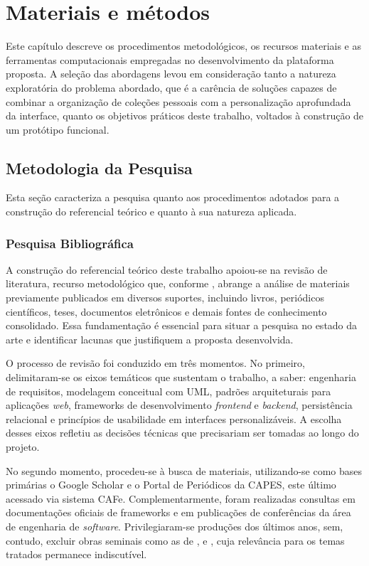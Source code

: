 \chapter{Materiais e métodos}
\label{cap:03}

Este capítulo descreve os procedimentos metodológicos, os recursos materiais e as ferramentas computacionais empregadas no desenvolvimento da plataforma proposta. A seleção das abordagens levou em consideração tanto a natureza exploratória do problema abordado, que é a carência de soluções capazes de combinar a organização de coleções pessoais com a personalização aprofundada da interface, quanto os objetivos práticos deste trabalho, voltados à construção de um protótipo funcional.

\section{Metodologia da Pesquisa}

Esta seção caracteriza a pesquisa quanto aos procedimentos adotados para a construção do referencial teórico e quanto à sua natureza aplicada.

\subsection{Pesquisa Bibliográfica}

A construção do referencial teórico deste trabalho apoiou-se na revisão de literatura, recurso metodológico que, conforme \cite{fontelles2009}, abrange a análise de materiais previamente publicados em diversos suportes, incluindo livros, periódicos científicos, teses, documentos eletrônicos e demais fontes de conhecimento consolidado. Essa fundamentação é essencial para situar a pesquisa no estado da arte e identificar lacunas que justifiquem a proposta desenvolvida.

O processo de revisão foi conduzido em três momentos. No primeiro, delimitaram-se os eixos temáticos que sustentam o trabalho, a saber: engenharia de requisitos, modelagem conceitual com UML, padrões arquiteturais para aplicações \textit{web}, frameworks de desenvolvimento \textit{frontend} e \textit{backend}, persistência relacional e princípios de usabilidade em interfaces personalizáveis. A escolha desses eixos refletiu as decisões técnicas que precisariam ser tomadas ao longo do projeto.

No segundo momento, procedeu-se à busca de materiais, utilizando-se como bases primárias o Google Scholar e o Portal de Periódicos da CAPES, este último acessado via sistema CAFe. Complementarmente, foram realizadas consultas em documentações oficiais de frameworks e em publicações de conferências da área de engenharia de \textit{software}. Privilegiaram-se produções dos últimos anos, sem, contudo, excluir obras seminais como as de \cite{Sommerville2011}, \cite{pressman2016} e \cite{Larman2007}, cuja relevância para os temas tratados permanece indiscutível.

